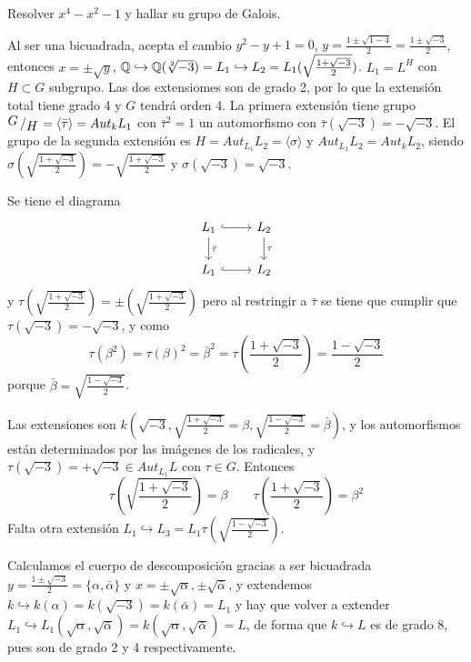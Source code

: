  \begin{ejer}
  Resolver $x^4-x^2-1$ y hallar su grupo de Galois.
 \end{ejer}
 \begin{dem}
    Al ser una bicuadrada, acepta el cambio $y^2-y+1 = 0$, $y=\frac{1 \pm \sqrt{1-4}}{2} = \frac{1 \pm \sqrt{-3}}{2}$, entonces $x=\pm \sqrt{y}$, $\mathbb{Q} \hookrightarrow \mathbb{Q}(\sqrt[2]{-3}) = L_1 \hookrightarrow L_2 = L_1(\sqrt{{\frac{1+\sqrt{-3}}{2}}})$. $L_1 = L^H$ con $H\subset G$ subgrupo. Las dos extensiomes son de grado 2, por lo que la extensi\'on total tiene grado 4 y $G$ tendr\'a orden 4. La primera extensi\'on tiene grupo $\modulo{G}{H}= \langle \bar \tau \rangle = Aut_k L_1$ con $\bar \tau^2 =1$ un automorfismo con $\bar \tau(\sqrt{-3}) = -\sqrt{-3}$. El grupo de la segunda extensi\'on es $H = Aut_{L_1} L_2 = \langle \sigma \rangle$ y $Aut_{L_1}L_2 = Aut_{k} L_2$, siendo $\sigma\left(\sqrt{{\frac{1+\sqrt{-3}}{2}}}\right) = -\sqrt{{\frac{1+\sqrt{-3}}{2}}}$ y $\sigma(\sqrt{-3}) = \sqrt{-3}$.
    
    Se tiene el diagrama 
    $$\bt L_1\rar[hook] \arrow{d}{\bar \tau} & L_2 \arrow{d}{\tau} \\ L_1\rar[hook] & L_2  \et$$
    y $\tau\left(\sqrt{{\frac{1+\sqrt{-3}}{2}}}\right) = \pm \left(\sqrt{{\frac{1+\sqrt{-3}}{2}}}\right)$ pero al restringir a $\bar \tau$ se tiene que cumplir que $\tau (\sqrt{-3}) = -\sqrt{-3}$, y como 
    $$\tau(\beta^2) = \tau(\beta)^2 = \bar \beta^2 = \tau\left({\frac{1+\sqrt{-3}}{2}}\right)= \frac{1-\sqrt{-3}}{2}$$
    porque $\bar \beta = \sqrt{\frac{1-\sqrt{-3}}{2}}$. 

    Las extensiones son $k\left(\sqrt{-3}, \sqrt{{\frac{1+\sqrt{-3}}{2}}} = \beta, \sqrt{{\frac{1-\sqrt{-3}}{2}}} = \bar \beta \right)$, y los automorfismos est\'an determinados por las im\'agenes de los radicales, y $\tau(\sqrt{-3})= + \sqrt{-3} \in Aut_{L_1} L$ con $\tau \in G$. Entonces
    $$\tau\left( \sqrt{{\frac{1+\sqrt{-3}}{2}}} \right) = \beta \qquad \tau\left( {\frac{1+\sqrt{-3}}{2}} \right) = \beta^2$$
     Falta otra extensi\'on $L_1 \hookrightarrow L_3 = L_1\tau\left( \sqrt{{\frac{1-\sqrt{-3}}{2}}} \right)$.

     Calculamos el cuerpo de descomposici\'on gracias a ser bicuadrada $ y = \frac{1 \pm \sqrt{-3}}{2} = \{\alpha, \bar \alpha\}$ y $x = \pm \sqrt{\alpha}, \pm \sqrt{\bar \alpha}$, y extendemos $ k \hookrightarrow k (\alpha) = k(\sqrt{-3}) = k(\bar \alpha) = L_1$ y hay que volver a extender $L_1 \hookrightarrow L_1(\sqrt{\alpha}, \sqrt{\bar \alpha}) = k(\sqrt{\alpha}, \sqrt{\bar \alpha})= L$, de forma que $k \hookrightarrow L$ es de grado 8, pues son de grado 2 y 4 respectivamente.
    

\end{dem}
